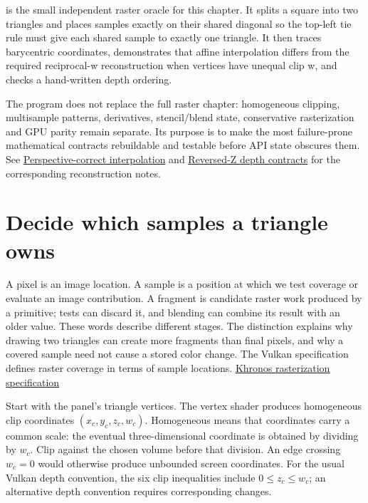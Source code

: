  is the small independent raster oracle for this chapter. It splits a square into two triangles and places samples exactly on their shared diagonal so the top-left tie rule must give each shared sample to exactly one triangle. It then traces barycentric coordinates, demonstrates that affine interpolation differs from the required reciprocal-w reconstruction when vertices have unequal clip w, and checks a hand-written depth ordering.

The program does not replace the full raster chapter: homogeneous clipping, multisample patterns, derivatives, stencil/blend state, conservative rasterization and GPU parity remain separate. Its purpose is to make the most failure-prone mathematical contracts rebuildable and testable before API state obscures them. See \hyperref[appendix-1ed5f96c73ea]{Perspective-correct interpolation} and \hyperref[appendix-275ec8847057]{Reversed-Z depth contracts} for the corresponding reconstruction notes.

\section{Decide which samples a triangle owns}\label{03-visual-computing-i-ch012-decide-which-samples-a-triangle-owns}

\hypertarget{03-visual-computing-i-ch012-decide-which-samples-a-triangle-owns}{}

A pixel is an image location. A sample is a position at which we test coverage or evaluate an image contribution. A fragment is candidate raster work produced by a primitive; tests can discard it, and blending can combine its result with an older value. These words describe different stages. The distinction explains why drawing two triangles can create more fragments than final pixels, and why a covered sample need not cause a stored color change. The Vulkan specification defines raster coverage in terms of sample locations. \href{https://docs.vulkan.org/spec/latest/chapters/primsrast.html}{Khronos rasterization specification}

Start with the panel's triangle vertices. The vertex shader produces homogeneous clip coordinates \((x_c,y_c,z_c,w_c)\). Homogeneous means that coordinates carry a common scale: the eventual three-dimensional coordinate is obtained by dividing by \(w_c\). Clip against the chosen volume before that division. An edge crossing \(w_c=0\) would otherwise produce unbounded screen coordinates. For the usual Vulkan depth convention, the six clip inequalities include \(0\le z_c\le w_c\); an alternative depth convention requires corresponding changes.

